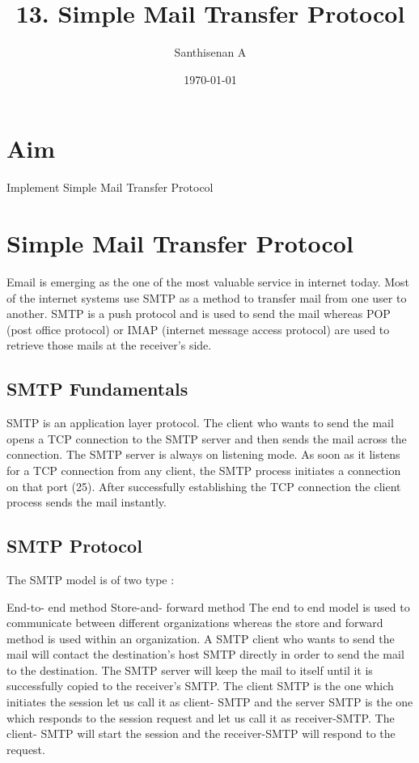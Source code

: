 \documentclass[a4paper,12pt]{article}
\begin{document}
    \title{13. Simple Mail Transfer Protocol}
    \author{Santhisenan A}
    \date{\today}
    \maketitle

\section{Aim}
Implement Simple Mail Transfer Protocol

\section { Simple Mail Transfer Protocol}
Email is emerging as the one of the most valuable service in internet today. 
Most of the internet systems use SMTP as a method to transfer mail from one user to another. 
SMTP is a push protocol and is used to send the mail whereas POP (post office protocol) 
or IMAP (internet message access protocol) are used to retrieve those mails at the receiver’s side.

\subsection{SMTP Fundamentals}
SMTP is an application layer protocol. The client who wants to send the mail opens a TCP connection to the 
SMTP server and then sends the mail across the connection. The SMTP server is always on listening mode. 
As soon as it listens for a TCP connection from any client, the SMTP process initiates a connection on that port 
(25). After successfully establishing the TCP connection the client process sends the mail instantly.

\subsection{SMTP Protocol}

The SMTP model is of two type :

End-to- end method
Store-and- forward method
The end to end model is used to communicate between different organizations whereas the store and forward method is used within an organization. A SMTP client who wants to send the mail will contact the destination’s host SMTP directly in order to send the mail to the destination. The SMTP server will keep the mail to itself until it is successfully copied to the receiver’s SMTP.
The client SMTP is the one which initiates the session let us call it as client- SMTP and the server SMTP is the one which responds to the session request and let us call it as receiver-SMTP. The client- SMTP will start the session and the receiver-SMTP will respond to the request.
\end{document}
